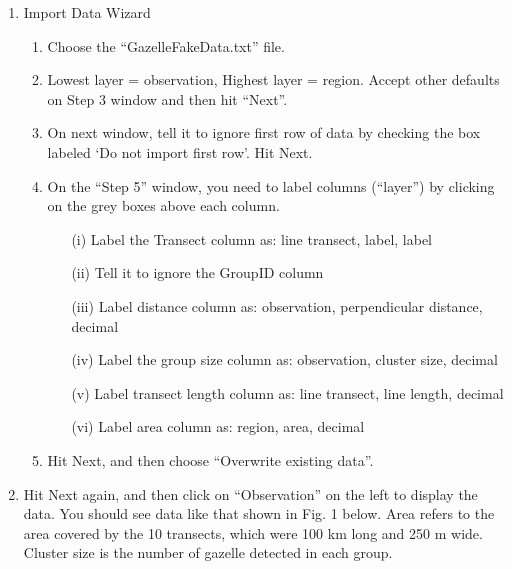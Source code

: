\documentclass[12pt]{article}
\begin{document}
\begin{enumerate}
  \item Import Data Wizard
  \begin{enumerate}
    \item Choose the ``GazelleFakeData.txt'' file. %
    \item Lowest layer = observation, Highest layer = region. Accept
      other defaults on Step 3 window and then hit ``Next''. 
    \item On next window, tell it to ignore first row of data by
      checking the box labeled `Do not import first row'. Hit Next. 
    \item On the ``Step 5'' window, you need to label columns
      (``layer'') by clicking on the grey boxes above each column. 
      \begin{itemize}
        \item[(i)] Label the Transect column as: line transect, label,
          label  
        \item[(ii)] Tell it to ignore the GroupID column
        \item[(iii)] Label distance column as: observation, perpendicular
          distance, decimal 
        \item[(iv)] Label the group size column as: observation, cluster
          size, decimal 
        \item[(v)] Label transect length column as: line transect, line
          length, decimal 
        \item[(vi)] Label area column as: region, area, decimal
      \end{itemize}
    \item Hit Next, and then choose ``Overwrite existing data''. 
  \end{enumerate}
  \item Hit Next again, and then click on ``Observation'' on the left to
    display the data. You should see data like that shown in Fig. 1
    below. Area refers to the area covered by the 10 transects,
    which were 100 km long and 250 m wide. Cluster size is the number
    of gazelle detected in each group. 
\end{enumerate}
\end{document}

